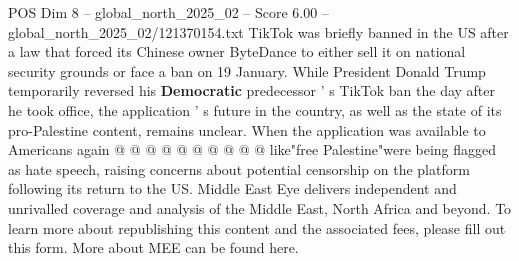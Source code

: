 \begin{textsample}{POS Dim 8 – global\_north\_2025\_02 – Score 6.00 – global\_north\_2025\_02/121370154.txt}
TikTok was briefly banned in the US after a law that forced its Chinese owner ByteDance to either sell it on national security grounds or face a ban on 19 January.
While President Donald Trump temporarily reversed his \textbf{Democratic} predecessor ' s TikTok ban the day after he took office, the application ' s future in the country, as well as the state of its pro-Palestine content, remains unclear.
When the application was available to Americans again @ @ @ @ @ @ @ @ @ @ like"free Palestine"were being flagged as hate speech, raising concerns about potential censorship on the platform following its return to the US.
Middle East Eye delivers independent and unrivalled coverage and analysis of the Middle East, North Africa and beyond.
To learn more about republishing this content and the associated fees, please fill out this form.
More about MEE can be found here.

\end{textsample}
